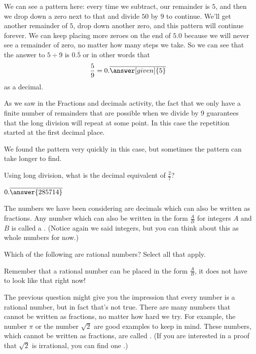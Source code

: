 \documentclass{ximera}
\begin{document}
\begin{example}
\begin{image}
\begin{tikzpicture}[font=\large, every node/.style={inner sep=0pt, outer sep=1pt}]
\end{tikzpicture}
\end{image}



We can see a pattern here: every time we subtract, our remainder is $5$, and then we drop down a zero next to that and divide $50$ by $9$ to continue. We'll get another remainder of $5$, drop down another zero, and this pattern will continue forever. We can keep placing more zeroes on the end of $5.0$ because we will never see a remainder of zero, no matter how many steps we take. So we can see that the answer to $5 \div 9$ is $0.\overline{5}$ or in other words that
\[
\frac{5}{9} = 0.\overline{\answer[given]{5}}
\]
as a decimal.
\end{example}

As we saw in the Fractions and decimals activity, the fact that we only have a finite number of remainders that are possible when we divide by $9$ guarantees that the long division will repeat at some point. In this case the repetition started at the first decimal place. 

We found the pattern very quickly in this case, but sometimes the pattern can take longer to find.
\begin{question}
Using long division, what is the decimal equivalent of $\frac{2}{7}$?

\begin{prompt}
$0.\overline{\answer{285714}}$
\end{prompt}
\end{question}

The numbers we have been considering are decimals which can also be written as fractions. Any number which can also be written in the form $\frac{A}{B}$ for integers $A$ and $B$ is called a . (Notice again we said integers, but you can think about this as whole numbers for now.)
\begin{question}
Which of the following are rational numbers? Select all that apply.
\begin{selectAll}
\end{selectAll}
\begin{hint}
Remember that a rational number can be placed in the form $\frac{A}{B}$, it does not have to look like that right now!
\end{hint}
\end{question}
The previous question might give you the impression that every number is a rational number, but in fact that's not true. There are many numbers that cannot be written as fractions, no matter how hard we try. For example, the number $\pi$ or the number $\sqrt{2}$ are good examples to keep in mind. These numbers, which cannot be written as fractions, are called . (If you are interested in a proof that $\sqrt{2}$ is irrational, you can find one .)
\end{document}
